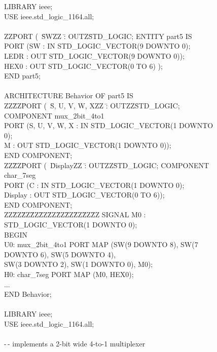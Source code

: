\documentclass[epsfig,10pt,fullpage]{article}
\begin{document}
\begin{figure}[h!]
\begin{center}
\begin{minipage}[t]{12.5 cm}
\begin{tabbing}
LIBRARY ieee;\\
USE ieee.std\_logic\_1164.all;\\
~\\
ZZ\=PORT (~\=SWZZ \=: OUTZ\=STD\_LOGIC;\kill
ENTITY part5 IS \\
\>PORT (\>SW \>: IN \>STD\_LOGIC\_VECTOR(9 DOWNTO 0);\\
\>\>LEDR \>: OUT \>STD\_LOGIC\_VECTOR(9 DOWNTO 0));\\
\>\>HEX0	: OUT STD\_LOGIC\_VECTOR(0 TO 6) );\\
END part5;\\
~\\
ARCHITECTURE Behavior OF part5 IS\\
ZZ\=ZZ\=PORT (~\=S, U, V, W, XZZ \=: OUTZZ\=STD\_LOGIC;\kill
\>COMPONENT mux\_2bit\_4to1\\
\>\>PORT (\>S, U, V, W, X	\>: IN \>STD\_LOGIC\_VECTOR(1 DOWNTO 0);\\
\>\>\>M \>: OUT \>STD\_LOGIC\_VECTOR(1 DOWNTO 0));\\
\>END COMPONENT;\\
ZZ\=ZZ\=PORT (~\=DisplayZZ \=: OUTZZ\=STD\_LOGIC;\kill
\>COMPONENT char\_7seg\\
\>\>PORT (\>C \>: IN	\>STD\_LOGIC\_VECTOR(1 DOWNTO 0);\\
\>\>\>Display \>: OUT \>STD\_LOGIC\_VECTOR(0 TO 6));\\
\>END COMPONENT;\\
ZZ\=ZZ\=ZZ\=ZZ\=ZZ\=ZZ\=ZZ\=ZZ\=ZZ\=ZZ\=ZZ\kill
\>SIGNAL M0 : STD\_LOGIC\_VECTOR(1 DOWNTO 0);\\
BEGIN\\
\>U0: mux\_2bit\_4to1 PORT MAP (SW(9 DOWNTO 8), SW(7 DOWNTO 6), SW(5 DOWNTO 4),\\
\>\>SW(3 DOWNTO 2), SW(1 DOWNTO 0), M0);\\
\>H0: char\_7seg PORT MAP (M0, HEX0);\\
\> $\ldots$\\
END Behavior;\\
~\\
LIBRARY ieee;\\
USE ieee.std\_logic\_1164.all;\\
~\\
-\,- implements a 2-bit wide 4-to-1 multiplexer\\

\end{tabbing}
\end{minipage}
\end{center}
\end{figure}
\end{document}
